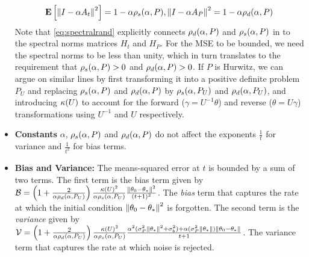 \begin{itemize}[leftmargin=*, before = \leavevmode\vspace{-\baselineskip}]
\begin{comment}
The output $\thh_t$ of the algorithm \eqref{eq:lsa} is the average of the internal states at times $s=0,\ldots,t-1$. The error dynamics of the internal states by looking at the behavior of $e_t\eqdef \theta_t-\ts$.
\begin{align}\label{eq:errec}
\theta_t&=\theta_{t-1}+\alpha(b_t-A_t\theta_{t-1})\nn\\
\theta_t-\ts&=\theta_{t-1}-\ts+\alpha\left(b_t-A_t(\theta_{t-1}-\ts+\ts)\right)\nn\\
e_t&=e_{t-1}+\alpha(b_t-A_t e_t -A_t\ts)\nn\\
e_t&=\underbrace{((I-\alpha A_t))}_{\text{Random-Matrix}} e_{t-1}+\underbrace{\alpha(N_t -(M_t)\ts)}_{\text{Noise}}
\end{align}
From \eqref{errec} it is clear that the error dynamics depends on the $i)$ properties of the random matrix, $ii)$ properties of the noise. In the absence of the noise term in \eqref{eq:errec}, we have $e_t=(I-\alpha A_t) e_{t-1}=\Pi_{s=1}(I-\alpha A_s) e_0$, i.e., the initial error is get multiplied by a product of random matrices. In such a scenario, we can guess that whether or not the algorithm forgets the bias $\norm{\theta_0-\ts}$, depends on whether the matrix product is contracting. One way to characterize this contracting property is to look at the spectral radius of the random matrix, which is given by
\end{comment}
\begin{align}\label{eq:spectralrand}
\mathbf{E}\left[\left\| I-\alpha A_t\right\|^2\right]=1-\alpha \rho_s(\alpha,P), {\left\| I-\alpha A_P\right\|^2}=1-\alpha \rho_d(\alpha,P)
\end{align}
Note that \eqref{eq:spectralrand} explicitly connects $\rho_d(\alpha,P)$ and $\rho_s(\alpha,P)$ in  to the spectral norms matrices $H_t$ and $H_P$. For the MSE to be bounded, we need the spectral norms to be less than unity, which in turn translates to the requirement that $\rho_s(\alpha,P)>0$ and $\rho_d(\alpha,P)>0$. If $P$ is Hurwitz, we can argue on similar lines by first transforming it into a positive definite problem $P_U$ and replacing $\rho_s(\alpha,P)$ and $\rho_d(\alpha,P)$ by $\rho_s(\alpha,P_U)$ and $\rho_d(\alpha,P_U)$, and introducing $\kappa(U)$ to account for the forward ($\gamma=U^{-1}\theta$) and reverse ($\theta=U\gamma$) transformations using $U^{-1}$ and $U$ respectively.
\item \textbf{Constants} {$\alpha$, $\rho_s(\alpha,P)$ and $\rho_d(\alpha,P)$} do not affect the exponents $\frac{1}{t}$ for variance and $\frac{1}{t^2}$ for bias terms.
\item \textbf{Bias and Variance:} The means-squared error at $t$ is bounded by a sum of two terms. The first term is the bias term given by $\mathcal{B}=\left(1+\frac2{\alpha\rho_d(\alpha,P_U)}\right)\frac{\kappa(U)^2}{\alpha \rho_s(\alpha,P_U)}\frac{\left\| \theta_0-\theta_*\right\|^2}{(t+1)^2}$.  The \emph{bias} term that captures the rate at which the initial condition $\left\| \theta_0-\theta_*\right\|^2$ is forgotten. The second term is the \emph{variance} given by $\mathcal{V}=\left(1+\frac2{\alpha\rho_d(\alpha,P_U)}\right)\frac{\kappa(U)^2}{\alpha \rho_s(\alpha,P_U)} \frac{\alpha^2(\sigma_P^2\left\| \theta_*\right\|^2+\sigma_b^2)+\alpha (\sigma_P^2\left\| \theta_*\right\|)\left\| \theta_0-\theta_*\right\|}{t+1} $. The variance term that captures the rate at which noise is rejected.

\end{itemize}
